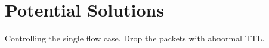 \section{Potential Solutions}


 Controlling the single flow case. Drop the packets with
abnormal TTL.




